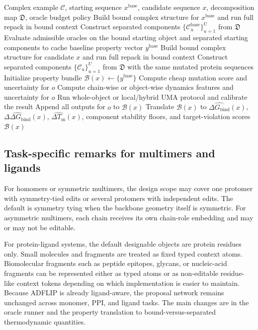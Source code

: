 \documentclass[11pt]{article}
\newcommand{\Tm}{\ensuremath{T_{\mathrm m}}}
\newcommand{\ddGbind}{\ensuremath{\Delta\Delta G_{\mathrm{bind}}}}
\newcommand{\dGbind}{\ensuremath{\Delta G_{\mathrm{bind}}}}
\newcommand{\Cx}{\mathcal{C}}
\begin{document}
\begin{algorithm}[H]
\caption{Complex and component oracle runner}
\label{alg:complexrunner}
\begin{algorithmic}[1]
\Require Complex example $\Cx$, starting sequence $x^{\mathrm{base}}$, candidate sequence $x$, decomposition map $\mathfrak{D}$, oracle budget policy
\State Build bound complex structure for $x^{\mathrm{base}}$ and run full repack in bound context
\State Construct separated components $\{\Cx_u^{\mathrm{base}}\}_{u=1}^{U}$ from $\mathfrak{D}$
\State Evaluate admissible oracles on the bound starting object and separated starting components to cache baseline property vector $y^{\mathrm{base}}$
\State Build bound complex structure for candidate $x$ and run full repack in bound context
\State Construct separated components $\{\Cx_u\}_{u=1}^{U}$ from $\mathfrak{D}$ with the same mutated protein sequences
\State Initialize property bundle $\mathcal{B}(x) \leftarrow \{y^{\mathrm{base}}\}$
        \State Compute cheap mutation score and uncertainty for $o$
    \EndIf
        \State Compute chain-wise or object-wise dynamics features and uncertainty for $o$
    \EndIf
        \State Run whole-object or local/hybrid UMA protocol and calibrate the result
    \EndIf
    \State Append all outputs for $o$ to $\mathcal{B}(x)$
\EndFor
\State Translate $\mathcal{B}(x)$ to $\widehat{\dGbind}(x)$, $\widehat{\ddGbind}(x)$, $\widehat{\Delta \Tm}(x)$, component stability floors, and target-violation scores
\State \Return $\mathcal{B}(x)$
\end{algorithmic}
\end{algorithm}



\subsection{Task-specific remarks for multimers and ligands}

For homomers or symmetric multimers, the design scope may cover one protomer with symmetry-tied edits or several protomers with independent edits. The default is symmetry tying when the backbone geometry itself is symmetric. For asymmetric multimers, each chain receives its own chain-role embedding and may or may not be editable.

For protein-ligand systems, the default designable objects are protein residues only. Small molecules and fragments are treated as fixed typed context atoms. Biomolecular fragments such as peptide epitopes, glycans, or nucleic-acid fragments can be represented either as typed atoms or as non-editable residue-like context tokens depending on which implementation is easier to maintain. Because ADFLIP is already ligand-aware, the proposal network remains unchanged across monomer, PPI, and ligand tasks. The main changes are in the oracle runner and the property translation to bound-versus-separated thermodynamic quantities.
\end{document}
